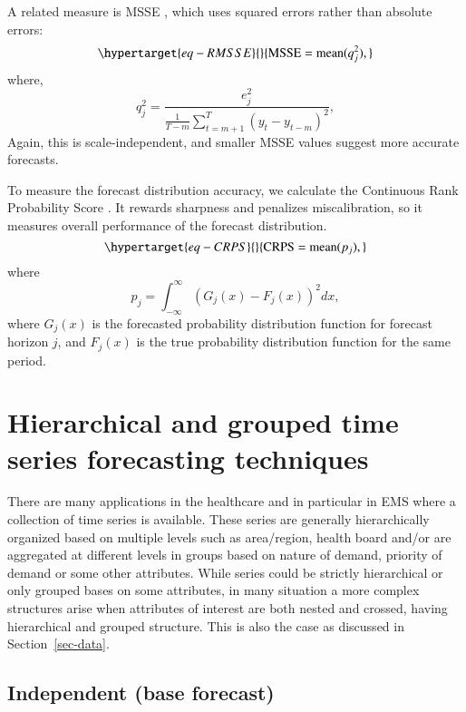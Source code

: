 \documentclass[
  authoryear,
  preprint,
  3p]{elsarticle}
\begin{document}
A related measure is MSSE \citep{hyndman2021forecasting}, which uses
squared errors rather than absolute errors:
\begin{equation}\protect\hypertarget{eq-RMSSE}{}{
  \text{MSSE} = \text{mean}(q_{j}^2),
}\label{eq-RMSSE}\end{equation} where, \[
  q^2_{j} = \frac{ e^2_{j}}
    {\displaystyle\frac{1}{T-m}\sum_{t=m+1}^T (y_{t}-y_{t-m})^2},
\] Again, this is scale-independent, and smaller MSSE values suggest
more accurate forecasts.

To measure the forecast distribution accuracy, we calculate the
Continuous Rank Probability Score \citep{gneiting2014probabilistic}. It
rewards sharpness and penalizes miscalibration, so it measures overall
performance of the forecast distribution.
\begin{equation}\protect\hypertarget{eq-CRPS}{}{
  \text{CRPS} = \text{mean}(p_j),
}\label{eq-CRPS}\end{equation} where \[
  p_j = \int_{-\infty}^{\infty} \left(G_j(x) - F_j(x)\right)^2dx,
\] where \(G_j(x)\) is the forecasted probability distribution function
for forecast horizon \(j\), and \(F_j(x)\) is the true probability
distribution function for the same period.

\hypertarget{sec-htc}{%
\section{Hierarchical and grouped time series forecasting
techniques}\label{sec-htc}}

There are many applications in the healthcare and in particular in EMS
where a collection of time series is available. These series are
generally hierarchically organized based on multiple levels such as
area/region, health board and/or are aggregated at different levels in
groups based on nature of demand, priority of demand or some other
attributes. While series could be strictly hierarchical or only grouped
bases on some attributes, in many situation a more complex structures
arise when attributes of interest are both nested and crossed, having
hierarchical and grouped structure. This is also the case as discussed
in Section~\ref{sec-data}.

\hypertarget{independent-base-forecast}{%
\subsection{Independent (base
forecast)}\label{independent-base-forecast}}
\end{document}
